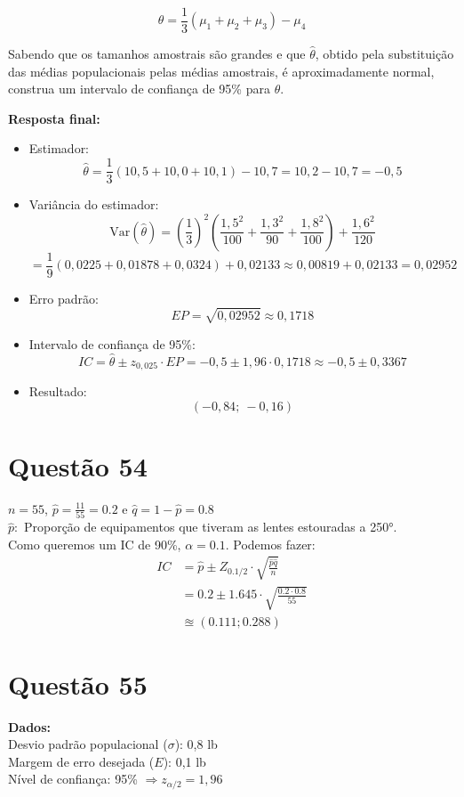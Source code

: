 \documentclass[12pt]{article}
\newcommand{\quest}[1]{\section*{Questão #1}} %
\begin{document}
\[
\theta = \frac{1}{3}(\mu_1 + \mu_2 + \mu_3) - \mu_4
\]

Sabendo que os tamanhos amostrais são grandes e que \( \hat{\theta} \), obtido pela substituição das médias populacionais pelas médias amostrais, é aproximadamente normal, construa um intervalo de confiança de 95\% para \( \theta \).

\textbf{Resposta final:}

\begin{itemize}
    \item Estimador:
    \[
    \hat{\theta} = \frac{1}{3}(10{,}5 + 10{,}0 + 10{,}1) - 10{,}7 = 10{,}2 - 10{,}7 = -0{,}5
    \]

    \item Variância do estimador:
    \[
    \text{Var}(\hat{\theta}) = \left( \frac{1}{3} \right)^2 \left( \frac{1{,}5^2}{100} + \frac{1{,}3^2}{90} + \frac{1{,}8^2}{100} \right) + \frac{1{,}6^2}{120}
    \]
    \[
    = \frac{1}{9} \left( 0{,}0225 + 0{,}01878 + 0{,}0324 \right) + 0{,}02133 \approx 0{,}00819 + 0{,}02133 = 0{,}02952
    \]

    \item Erro padrão:
    \[
    EP = \sqrt{0{,}02952} \approx 0{,}1718
    \]

    \item Intervalo de confiança de 95\%:
    \[
    IC = \hat{\theta} \pm z_{0{,}025} \cdot EP = -0{,}5 \pm 1{,}96 \cdot 0{,}1718 \approx -0{,}5 \pm 0{,}3367
    \]

    \item Resultado:
    \[
    \boxed{(-0{,}84;\ -0{,}16)}
    \]
\end{itemize}

\quest{54}
$n = 55$, $\hat{p} = \frac{11}{55} = 0.2$ e $\hat{q} = 1-\hat{p} = 0.8$\\
$\hat{p}:$ Proporção de equipamentos que tiveram as lentes estouradas a 250°.\\
Como queremos um IC de 90\%, $\alpha = 0.1$. Podemos fazer:
\begin{align*}
    IC &= \hat{p} \pm Z_{0.1/2} \cdot \sqrt{\frac{\hat{p}\hat{q}}{n}}\\
       &= 0.2 \pm 1.645 \cdot \sqrt{\frac{0.2 \cdot 0.8}{55}}\\
       &\approxeq (0.111;0.288)
\end{align*}

\quest{55}

\textbf{Dados:}\\
Desvio padrão populacional ($\sigma$): 0,8 lb\\
Margem de erro desejada ($E$): 0,1 lb\\
Nível de confiança: 95\% $\Rightarrow z_{\alpha/2} = 1{,}96$
\end{document}
